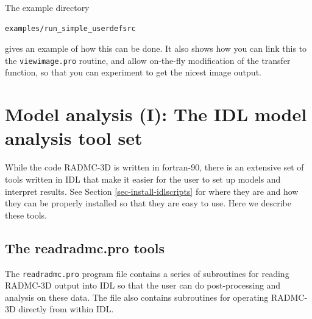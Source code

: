 \documentclass{report}
\newenvironment{asciibox}%
  {\begin{list}{}{%
    \setlength{\topsep}{0.5em}%
    \setlength{\parskip}{0em}%
    \setlength{\parsep}{0em}%
    \setlength{\itemsep}{0em}%
    \setlength{\rightmargin}{0em}%
    \setlength{\leftmargin}{3.0em}%
    \setlength{\labelsep}{1em}%
    \setlength{\labelwidth}{2em}%
  }\normalfont\footnotesize\item}
  {\end{list}}
\begin{document}
The example directory
\begin{asciibox}\begin{verbatim}
examples/run_simple_userdefsrc
\end{verbatim}\end{asciibox}
gives an example of how this can be done. It also shows how you can link
this to the {\small\tt viewimage.pro} routine, and allow on-the-fly
modification of the transfer function, so that you can experiment to get the
nicest image output.


\chapter{Model analysis (I): The IDL model analysis tool set}
\label{chap-idl-analysis-tools}
%
While the code RADMC-3D is written in fortran-90, there is an extensive set
of tools written in IDL that make it easier for the user to set up models
and interpret results. See Section \ref{sec-install-idlscripts} for where
they are and how they can be properly installed so that they are easy to
use. Here we describe these tools. 


\section{The readradmc.pro tools}
\label{sec-readradmc}
%
The {\small\tt readradmc.pro} program file contains a series of subroutines for
reading RADMC-3D output into IDL so that the user can do post-processing and
analysis on these data. The file also contains subroutines for operating
RADMC-3D directly from within IDL. 
\end{document}
